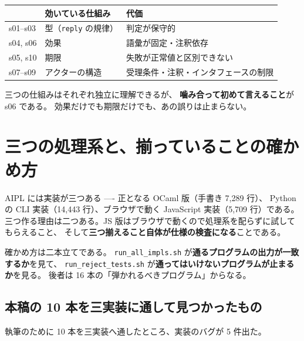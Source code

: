 \documentclass[11pt,a4paper]{ltjsarticle}
\theoremstyle{definition}
\theoremstyle{remark}
\begin{document}
\begin{center}
\begin{tabular}{lll}
\toprule
& 効いている仕組み & 代価 \\
\midrule
s01--s03 & 型（\texttt{reply} の規律） & 判定が保守的 \\
s04, s06 & 効果 & 語彙が固定・注釈依存 \\
s05, s10 & 期限 & 失敗が正常値と区別できない \\
s07--s09 & アクターの構造 & 受理条件・注釈・インタフェースの制限 \\
\bottomrule
\end{tabular}
\end{center}

三つの仕組みはそれぞれ独立に理解できるが、
\textbf{噛み合って初めて言えること}が s06 である。
効果だけでも期限だけでも、あの誤りは止まらない。

\section{三つの処理系と、揃っていることの確かめ方}
\label{sec:impl}

AIPL には実装が三つある ---- 正となる OCaml 版（手書き 7,289 行）、
Python の CLI 実装（14,443 行）、ブラウザで動く JavaScript 実装（5,709 行）である。
三つ作る理由は二つある。JS 版はブラウザで動くので処理系を配らずに試してもらえること、
そして\textbf{三つ揃えること自体が仕様の検査になる}ことである。

確かめ方は二本立てである。
\texttt{run\_all\_impls.sh} が\textbf{通るプログラムの出力が一致するか}を見て、
\texttt{run\_reject\_tests.sh} が\textbf{通ってはいけないプログラムが止まるか}を見る。
後者は 16 本の「弾かれるべきプログラム」からなる。

\subsection{本稿の 10 本を三実装に通して見つかったもの}

執筆のために 10 本を三実装へ通したところ、実装のバグが 5 件出た。
\end{document}
